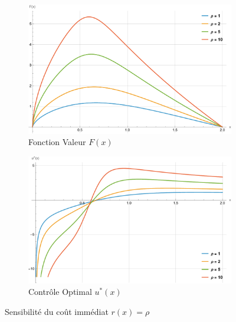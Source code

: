 \begin{figure}[htb]
    \centering
    \begin{subfigure}{0.49\linewidth}
        \includegraphics[width=\linewidth]{img/validation/P1/p1_R_value.pdf}
        \caption{Fonction Valeur $F(x)$}\label{fig:RhoValueVisualisation1}
    \end{subfigure}
    \hfill
    \begin{subfigure}{0.49\linewidth}
        \includegraphics[width=\linewidth]{img/validation/P1/p1_R_control.pdf}
        \caption{Contrôle Optimal $u^*(x)$}\label{fig:RhoControlVisualisation1}
    \end{subfigure}
    \caption{Sensibilité du coût immédiat $r(x)=\rho$}\label{fig:RhoValueControlComparison1}
\end{figure}
